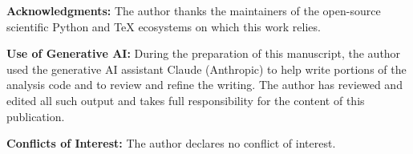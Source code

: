 \documentclass[preprint,12pt]{elsarticle}
\theoremstyle{definition}
\begin{document}
\vspace{4pt}
\noindent\textbf{Acknowledgments:} The author thanks the maintainers of the open-source scientific Python and \TeX{} ecosystems on which this work relies.

\vspace{4pt}
\noindent\textbf{Use of Generative AI:} During the preparation of this manuscript, the author used the generative AI assistant Claude (Anthropic) to help write portions of the analysis code and to review and refine the writing. The author has reviewed and edited all such output and takes full responsibility for the content of this publication.

\vspace{6pt}
\noindent\textbf{Conflicts of Interest:} The author declares no conflict of interest.


\end{document}
